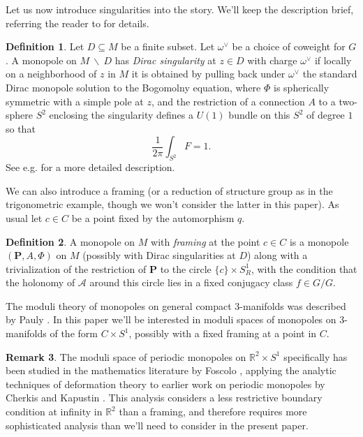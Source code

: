 \documentclass[11pt, oneside, reqno]{amsart}
\theoremstyle{definition} \newtheorem{definition}{Definition}[section]
\theoremstyle{definition} \newtheorem{remark}[definition]{Remark}
\theoremstyle{definition} \newtheorem{remarks}[definition]{Remarks}
\theoremstyle{definition} \newtheorem{question}[definition]{Question}
\theoremstyle{definition} \newtheorem*{note}{Note}
\theoremstyle{definition} \newtheorem{example}[definition]{Example}
\theoremstyle{definition} \newtheorem{examples}[definition]{Examples}
\newcommand{\mc}[1]{\mathcal{#1}}
\newcommand{\bo}[1]{\boldsymbol{#1}}
\newcommand{\bs}{\ \backslash \ }
\newcommand{\RR}{\mathbb{R}}
\newcommand{\sub}{\subseteq}
\begin{document}
Let us now introduce singularities into the story.  We'll keep the description brief, referring the reader to \cite{CharbonneauHurtubise, Smith} for details.
\begin{definition}
Let $D \sub M$ be a finite subset.  Let $\omega^\vee$ be a choice of coweight for $G$.  A monopole on $M \bs D$ has \emph{Dirac singularity} at $z \in D$ with charge $\omega^\vee$ if locally on a neighborhood of $z$ in $M$ it is obtained by pulling back under $\omega^\vee$ the standard Dirac monopole solution to the Bogomolny equation, where $\Phi$ is spherically symmetric with a simple pole at $z$, and the restriction of a connection $A$ to a two-sphere $S^2$ enclosing the singularity defines a $U(1)$ bundle on this $S^2$ of degree $1$ so that
    \[\frac{1}{2\pi} \int_{S^2} F = 1 .\]
  See e.g. \cite[Section 2.2]{CharbonneauHurtubise} for a more detailed description.
\end{definition}

We can also introduce a framing (or a reduction of structure group as in the trigonometric example, though we won't consider the latter in this paper).  As usual let $c \in C$ be a point fixed by the automorphism $q$.
\begin{definition}
  A monopole on $M$ with \emph{framing} at the point $c \in C$ is a monopole $(\bo P,A,\Phi)$ on $M$ (possibly with Dirac singularities at $D$) along with a trivialization of the restriction of $\bo P$ to the circle $\{c\} \times S^1_R$, with the condition that the holonomy of $\mc A$ around this circle lies in a fixed conjugacy class $f \in G/G$.
\end{definition}

The moduli theory of monopoles on general compact 3-manifolds was described by Pauly \cite{Pauly}.  In this paper we'll be interested in moduli spaces of monopoles on 3-manifolds of the form $C \times S^1$, possibly with a fixed framing at a point in $C$.  

\begin{remark}
The moduli space of periodic monopoles on $\RR^2 \times S^1$ specifically has been studied in the mathematics literature by Foscolo \cite{FoscoloDef} , applying the analytic techniques of deformation theory to earlier work on periodic monopoles by Cherkis and Kapustin \cite{CherkisKapustin1, CherkisKapustin2}. This analysis considers a less restrictive boundary condition at infinity in $\RR^2$ than a framing, and therefore requires more sophisticated analysis than we'll need to consider in the present paper.
\end{remark}
\end{document}
